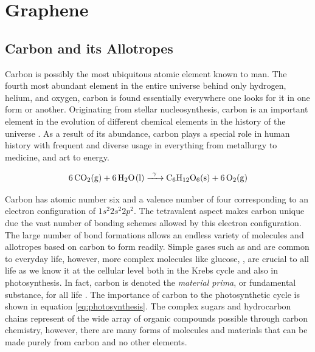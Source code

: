 \chapter{\sc Graphene}
\label{ch:Graphene}

\section{Carbon and its Allotropes}

Carbon is possibly the most ubiquitous atomic element known to man. The fourth most abundant element in the entire universe behind only hydrogen, helium, and oxygen, carbon is found essentially everywhere one looks for it in one form or another. Originating from stellar nucleosynthesis, carbon is an important element in the evolution of different chemical elements in the history of the universe \cite{katsnelson}. As a result of its abundance, carbon plays a special role in human history with frequent and diverse usage in everything from metallurgy to medicine, and art to energy.

\begin{equation}
  \label{eq:photosynthesis}
  \ce{6 CO2(g) + 6 H2O(l) ->[ \gamma ] C6H12O6(s) + 6 O2(g)}
\end{equation}

Carbon has atomic number six and a valence number of four corresponding to an electron configuration of  $1s^2 2s^2 2p^2$. The tetravalent aspect makes carbon unique due the vast number of bonding schemes allowed by this electron configuration. The large number of bond formations allows an endless variety of molecules and allotropes based on carbon to form readily. Simple gases such as  and  are common to everyday life, however, more complex molecules like glucose, , are crucial to all life as we know it at the cellular level both in the Krebs cycle and also in photosynthesis. In fact, carbon is denoted the \emph{material prima}, or fundamental substance, for all life \cite{geim-elec}. The importance of carbon to the photosynthetic cycle is shown in equation \ref{eq:photosynthesis}. The complex sugars and hydrocarbon chains represent of the wide array of organic compounds possible through carbon chemistry, however, there are many forms of molecules and materials that can be made purely from carbon and no other elements.

